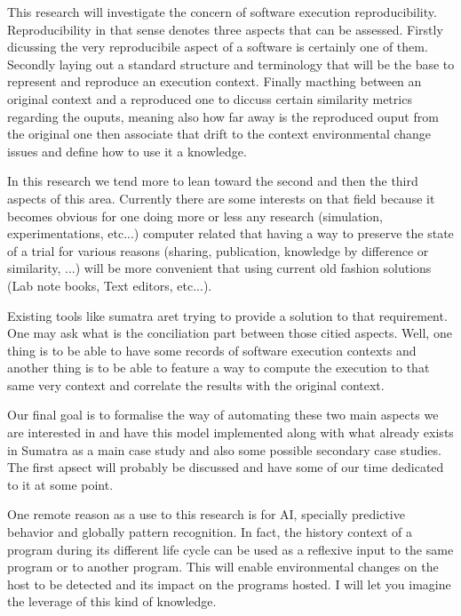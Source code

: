 

This research will investigate the concern of software execution reproducibility.
Reproducibility in that sense denotes three aspects that can be assessed. Firstly dicussing the very
reproducibile aspect of a software is certainly one of them. Secondly laying out a standard structure and
 terminology that will be the base to represent and reproduce an execution context. Finally
 macthing between an original context and a reproduced one to diccuss certain similarity metrics regarding
the ouputs, meaning also how far away is the reproduced ouput from the original one then associate that drift to
the context environmental change issues and define how to use it a knowledge.

In this research we tend more to lean toward the second and then the third aspects of this area.
Currently there are some interests on that field because it becomes obvious for one doing more or 
less any research (simulation, experimentations, etc...) computer related that having a way to preserve
the state of a trial for various reasons (sharing, publication, knowledge by difference or similarity, ...)
will be more convenient that using current old fashion solutions (Lab note books, Text editors, etc...).

Existing tools like sumatra aret trying to provide a solution to that requirement.
One may ask what is the conciliation part between those citied aspects. Well, one thing is to be
able to have some records of software execution contexts and another thing is to be able to feature
a way to compute the execution to that same very context and correlate the results with the original context.

Our final goal is to formalise the way of automating these two main aspects we are interested in and 
have this model implemented along with what already exists in Sumatra as a main case study and also
some possible secondary case studies. The first apsect will probably be discussed and have some of our time dedicated to it at some point.

One remote reason as a use to this research is for AI, specially predictive behavior and globally pattern recognition. In fact, the history context of a program during its different life cycle can be used as a reflexive input to the same program or to another program. This will enable environmental changes on the host to be detected and its impact on the programs hosted. I will let you imagine the leverage of this kind of knowledge.
